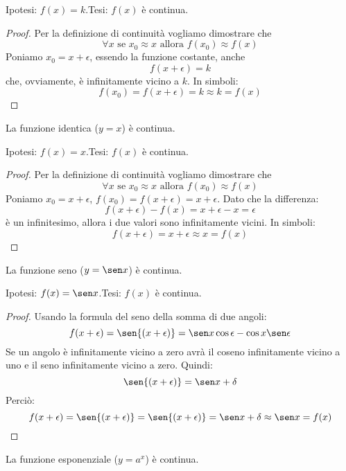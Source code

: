 \noindent Ipotesi: \(f(x)=k\).\tab Tesi: \(f(x)\) è continua.

\begin{proof}
Per la definizione di continuità vogliamo dimostrare che 
\[\forall x \text{ se } x_0 \approx x \text{ allora } f(x_0) \approx f(x)\]
Poniamo \(x_0=x+\epsilon\), essendo la funzione costante, anche 
\[f(x+\epsilon)=k\] 
che, ovviamente, è infinitamente vicino a \(k\). In simboli:
\[f(x_0) = f(x+\epsilon) = k \approx k = f(x)\] 
\end{proof}

\begin{teorema}
La funzione identica (\(y=x\)) è continua.
\end{teorema}

\noindent Ipotesi: \(f(x)=x\).\tab Tesi: \(f(x)\) è continua.

\begin{proof}
Per la definizione di continuità vogliamo dimostrare che 
\[\forall x \text{ se } x_0 \approx x \text{ allora } f(x_0) \approx f(x)\]
Poniamo \(x_0=x+\epsilon\), \(f(x_0) = f(x+\epsilon)=x+\epsilon\). 
Dato che la differenza:
\[f(x+\epsilon)-f(x) = x+\epsilon-x= \epsilon\]
è un infinitesimo, allora i due valori sono infinitamente vicini. In simboli:
\[f(x+\epsilon) = x+\epsilon \approx x = f(x)\] 
\end{proof}

\begin{teorema}
La funzione seno (\(y=\sen x\)) è continua.
\end{teorema}

\noindent Ipotesi: \(f(x)=\sen x\).\tab Tesi: \(f(x)\) è continua.

\begin{proof}
Usando la formula del seno della somma di due angoli:
\[f(x+\epsilon) =
\sen{(x+\epsilon)} = \sen x \cos \epsilon - \cos x \sen \epsilon\]
Se un angolo è infinitamente vicino a zero avrà il coseno infinitamente vicino 
a uno e il seno infinitamente vicino a zero. Quindi:
\[\sen{(x+\epsilon)} = \sen x + \delta\]
Perciò:
\[f(x+\epsilon) =
\sen{(x+\epsilon)} = \sen{(x+\epsilon)} = 
\sen x + \delta \approx \sen x = f(x)\]
\end{proof}

\begin{teorema}
La funzione esponenziale (\(y=a^x\)) è continua.
\end{teorema}

